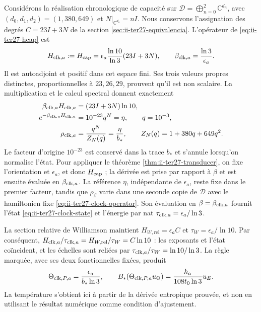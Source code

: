Considérons la réalisation chronologique de capacité sur
$\mathcal D=\bigoplus_{n=0}^2\mathbb C^{d_n}$, avec
$(d_0,d_1,d_2)=(1,380,649)$ et $N|_{\mathbb C^{d_n}}=nI$.
Nous conservons l’assignation des degrés $C=23I+3N$ de la section
\ref{sec:ii-ter27-equivalencia}. L’opérateur de
\eqref{eq:ii-ter27-hcap} est
\begin{equation}
 H_{{\rm clk},a}:=H_{\rm cap}
 =\epsilon_a\frac{\ln10}{\ln3}(23I+3N),\qquad
 \beta_{{\rm clk},a}=\frac{\ln3}{\epsilon_a}.
 \label{eq:ii-ter27-clock-operator}
\end{equation}
Il est autoadjoint et positif dans cet espace fini. Ses trois valeurs propres
distinctes, proportionnelles à $23,26,29$, prouvent qu’il est non scalaire.
La multiplication et le calcul spectral donnent exactement
\begin{align}
 \beta_{{\rm clk},a}H_{{\rm clk},a}
   &=(23I+3N)\ln10,\nonumber\\
 e^{-\beta_{{\rm clk},a}H_{{\rm clk},a}}
   &=10^{-23}q^N=\eta,\qquad q=10^{-3},\nonumber\\
 \rho_{{\rm clk},a}
   &=\frac{q^N}{Z_N(q)}=\frac{\eta}{b_*},\qquad
 Z_N(q)=1+380q+649q^2.
 \label{eq:ii-ter27-clock-state}
\end{align}
Le facteur d’origine $10^{-23}$ est conservé dans la trace $b_*$ et s’annule
lorsqu’on normalise l’état. Pour appliquer le théorème
\ref{thm:ii-ter27-transducer}, on fixe l’orientation et $\epsilon_a$,
et donc $H_{\rm cap}$ ; la dérivée est prise par rapport à $\beta$ et
est ensuite évaluée en $\beta_{{\rm clk},a}$. La référence $\eta$,
indépendante de $\epsilon_a$, reste fixe dans le premier facteur,
tandis que $\rho_\beta$ varie dans une seconde copie de $\mathcal D$ avec
le hamiltonien fixe \eqref{eq:ii-ter27-clock-operator}. Son évaluation en
$\beta=\beta_{{\rm clk},a}$ fournit l’état
\eqref{eq:ii-ter27-clock-state} et l’énergie par nat
$\tau_{{\rm clk},a}=\epsilon_a/\ln3$.

La section relative de Williamson maintient
$H_{W,\mathrm{rel}}=\epsilon_a C$ et
$\tau_W=\epsilon_a/\ln10$. Par conséquent,
$H_{{\rm clk},a}/\tau_{{\rm clk},a}
 =H_{W,\mathrm{rel}}/\tau_W=C\ln10$ :
les exposants et l’état coïncident, et les échelles sont reliées par
$\tau_{{\rm clk},a}/\tau_W=\ln10/\ln3$.
La règle marquée, avec ses deux fonctionnelles fixées, produit
\begin{equation}
 \Theta_{{\rm clk},P,a}=\frac{\epsilon_a}{b_*\ln3},\qquad
 B_*(\Theta_{{\rm clk},P,a}u_\Theta)
 =\frac{h_a}{108t_0\ln3}u_E.
 \label{eq:ii-ter27-section-test}
\end{equation}
La température s’obtient ici à partir de la dérivée entropique prouvée, et non
en utilisant le résultat numérique comme condition d’ajustement.

